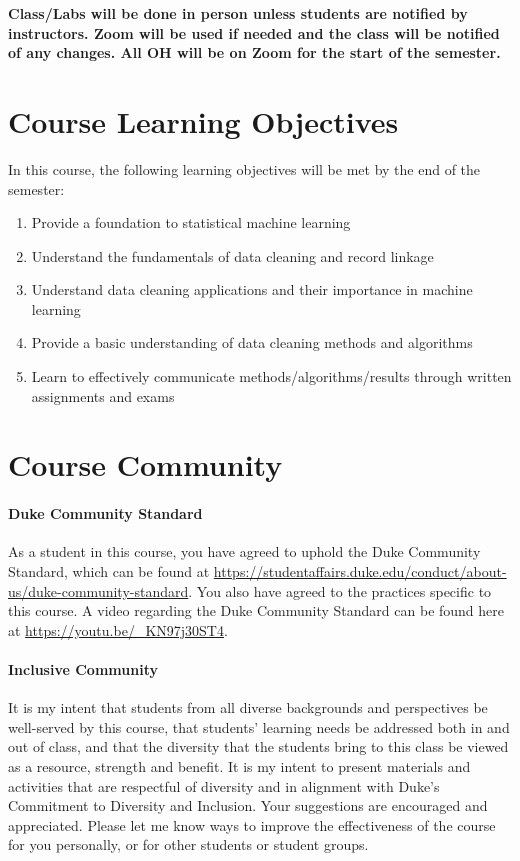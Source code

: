 \documentclass[11pt]{article}
\begin{document}
\textbf{Class/Labs will be done in person unless students are notified by instructors. Zoom will be used if needed and the class will be notified of any changes. All OH will be on Zoom for the start of the semester.}


\section{Course Learning Objectives}
In this course, the following learning objectives will be met by the end of the semester:\\
\begin{enumerate}
\item Provide a foundation to statistical machine learning
\item Understand the fundamentals of data cleaning and record linkage 
\item Understand data cleaning applications and their importance in machine learning 
\item Provide a basic understanding of data cleaning methods and algorithms
\item Learn to effectively communicate methods/algorithms/results through written assignments and exams 
\end{enumerate}

\section{Course Community}



\paragraph{Duke Community Standard} 
As a student in this course, you have agreed to uphold the Duke Community Standard, which can be found at \url{https://studentaffairs.duke.edu/conduct/about-us/duke-community-standard}. You also have agreed to the practices specific to this course.  A video regarding the Duke Community Standard can be found here at \url{https://youtu.be/_KN97j30ST4}. 


\paragraph{Inclusive Community}

It is my intent that students from all diverse backgrounds and perspectives be well-served by this course, that students’ learning needs be addressed both in and out of class, and that the diversity that the students bring to this class be viewed as a resource, strength and benefit. It is my intent to present materials and activities that are respectful of diversity and in alignment with Duke’s Commitment to Diversity and Inclusion. Your suggestions are encouraged and appreciated. Please let me know ways to improve the effectiveness of the course for you personally, or for other students or student groups. \\
\end{document}
